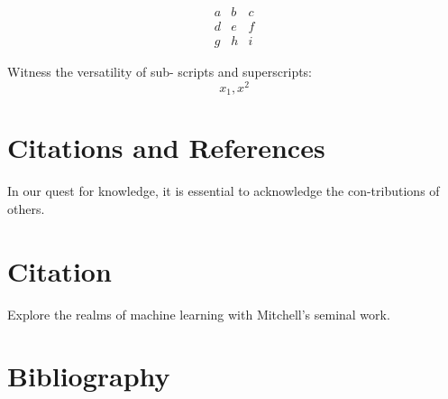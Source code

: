 \documentclass{article}
\begin{document}
\begin{multicols}{2}
\begin{equation*}
\begin{array}{ccc}
a & b & c \\
d & e & f \\
g & h & i
\end{array}
\end{equation*}

Witness the versatility of sub-
scripts and superscripts:
\begin{equation*}
    x_1,x^2
\end{equation*}

\section*{Citations and References}


In our quest for knowledge, it is essential to acknowledge the con-tributions of others.

\section*{Citation}
Explore the realms of machine
learning with Mitchell’s seminal work\cite{aws_nlp}.

\section*{Bibliography}





    
\end{multicols}
\end{document}
